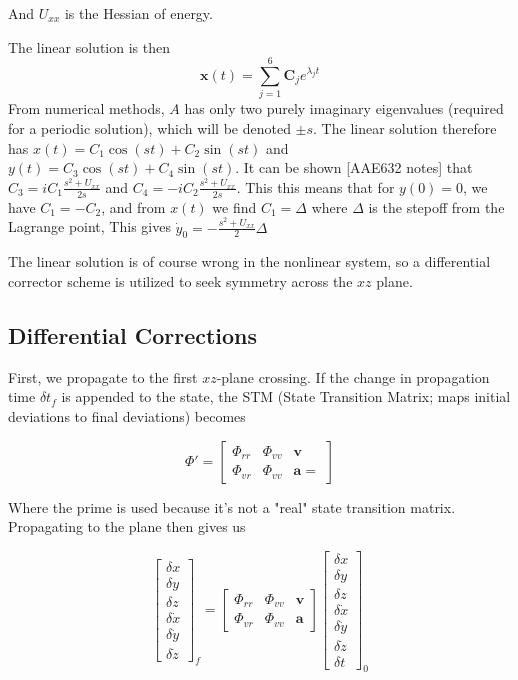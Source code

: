 \documentclass{article}
\newcommand{\vv}[1]{\bm{#1}}
\begin{document}
And $U_{xx}$ is the Hessian of energy. 

The linear solution is then 
\begin{equation*}
    \vv{x}(t)=\sum_{j=1}^6 \vv{C}_j e^{\lambda_j t}
\end{equation*}
From numerical methods, $A$ has only two purely imaginary eigenvalues (required for a periodic solution), which will be denoted $\pm s$.
The linear solution therefore has $x(t)=C_1 \cos(st)+C_2\sin(st)$ and $y(t)=C_3\cos(st)+C_4\sin(st)$. It can be shown [AAE632 notes] that $C_3=iC_1\frac{s^2+U_{xx}}{2s}$  and $C_4=-iC_2\frac{s^2+U_{xx}}{2s}$. This this means that for $y(0)=0$, we have $C_1=-C_2$, and from $x(t)$ we find $C_1=\Delta$ where $\Delta$ is the stepoff from the Lagrange point, This gives $\dot{y}_0=-\frac{s^2+U_{xx}}{2}\Delta$

The linear solution is of course wrong in the nonlinear system, so a differential corrector scheme is utilized to seek symmetry across the $xz$ plane.

\subsection{Differential Corrections}

First, we propagate to the first $xz$-plane crossing. If the change in propagation time $\delta t_f$ is appended to the state, the STM (State Transition Matrix; maps initial deviations to final deviations) becomes

\begin{equation*}
    \Phi'=\begin{bmatrix}\Phi_{rr}&\Phi_{vv}&\vv{v}\\\Phi_{vr}&\Phi_{vv}&\vv{a}=\end{bmatrix}
\end{equation*}

Where the prime is used because it's not a "real" state transition matrix. Propagating to the plane then gives us

\begin{equation*}
    \begin{bmatrix}\delta x\\\delta y\\\delta z\\\delta \dot{x}\\\delta \dot{y}\\\delta \dot{z}\end{bmatrix}_f=\begin{bmatrix}\Phi_{rr}&\Phi_{vv}&\vv{v}\\\Phi_{vr}&\Phi_{vv}&\vv{a}\end{bmatrix}\begin{bmatrix}\delta x\\\delta y\\\delta z\\\delta \dot{x}\\\delta \dot{y}\\\delta \dot{z}\\\delta t\end{bmatrix}_0
\end{equation*}
\end{document}
